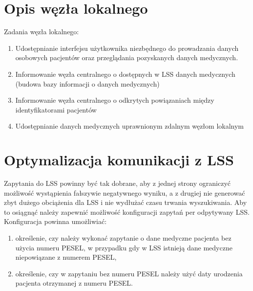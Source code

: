 \documentclass[a4paper]{report}
\begin{document}
\section{Opis węzła lokalnego}
Zadania węzła lokalnego:
  \begin{enumerate}
    \item Udostępnianie interfejsu użytkownika niezbędnego do prowadzania danych osobowych pacjentów
          oraz przeglądania pozyskanych danych medycznych.
    \item Informowanie węzła centralnego o dostępnych w LSS danych medycznych (budowa bazy informacji o danych medycznych)
    \item Informowanie węzła centralnego o odkrytych powiązaniach między identyfikatorami pacjentów
    \item Udostępnianie danych medycznych uprawnionym zdalnym węzłom lokalnym
  \end{enumerate}

\section{Optymalizacja komunikacji z LSS}

Zapytania do LSS powinny być tak dobrane, aby z jednej strony ograniczyć możliwość wystąpienia fałszywie negatywnego wyniku, a z drugiej nie generować zbyt dużego obciążenia dla LSS i nie wydłużać czasu trwania wyszukiwania. Aby to osiągnąć należy zapewnić możliwość konfiguracji zapytań per odpytywany LSS. Konfiguracja powinna umożliwiać:
\begin{enumerate}
  \item określenie, czy należy wykonać zapytanie o dane medyczne pacjenta bez użycia numeru PESEL, w przypadku gdy w LSS istnieją dane medyczne niepowiązane z numerem PESEL,
  \item określenie, czy w zapytaniu bez numeru PESEL należy użyć daty urodzenia pacjenta otrzymanej z numeru PESEL.
\end{enumerate}
\end{document}
